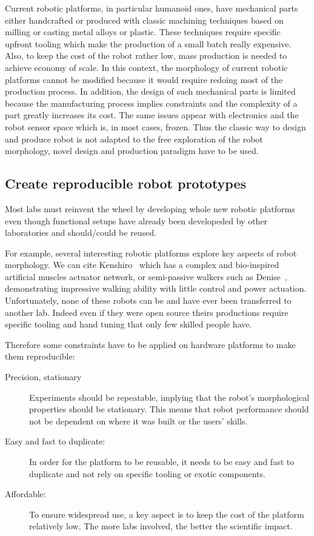 Current robotic platforms, in particular humanoid ones, have mechanical parts either handcrafted or produced with classic machining techniques based on milling or casting metal alloys or plastic.
These techniques require specific upfront tooling which make the production of a small batch really expensive. Also, to keep the cost of the robot rather low, mass production is needed to achieve economy of scale. In this context, the morphology of current robotic platforms cannot be modified because it would require redoing most of the production process. In addition, the design of such mechanical parts is limited because the manufacturing process implies constraints and the complexity of a part greatly increases its cost. The same issues appear with electronics and the robot sensor space which is, in most cases, frozen. Thus the classic way to design and produce robot is not adapted to the free exploration of the robot morphology, novel design and production paradigm have to be used.


\subsection{Create reproducible robot prototypes} %

Most labs must reinvent the wheel by developing whole new robotic platforms even though functional setups have already been developeded by other laboratories and should/could be reused.

For example, several interesting robotic platforms explore key aspects of robot morphology. We can cite Kenshiro~\parencite{nakanishi2013design} which has a complex and bio-inspired artificial muscles actuator network, or semi-passive walkers such as Denise~\parencite{wisse2005three}, demonstrating impressive walking ability with little control and power actuation. Unfortunately, none of these robots can be and have ever been transferred to another lab. Indeed even if they were open source theirs productions require specific tooling and hand tuning that only few skilled people have.

Therefore some constraints have to be applied on hardware platforms to make them reproducible:
\begin{description}
    \item[Precision, stationary] Experiments should be repeatable, implying that the robot’s morphological properties should be stationary. This means that robot performance should not be dependent on where it was built or the users’ skills.
    \item[Easy and fast to duplicate:] In order for the platform to be reusable, it needs to be easy and fast to duplicate and not rely on specific tooling or exotic components.
    \item[Affordable:] To ensure widespread use, a key aspect is to keep the cost of the platform relatively low. The more labs involved, the better the scientific impact.
\end{description}


